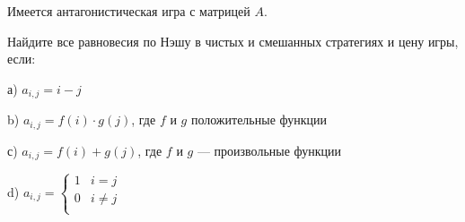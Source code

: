 \begin{problem}
 Имеется антагонистическая игра с матрицей $A$.

Найдите все равновесия по Нэшу в чистых и смешанных стратегиях и
цену игры, если:

а) $a_{i,j}=i-j$

b) $a_{i,j}=f(i)\cdot g(j)$, где $f$ и $g$ положительные функции

с) $a_{i,j}=f(i)+g(j)$, где $f$ и $g$ — произвольные функции

d) $a_{i,j}=\left\{
\begin{array}{cc}
  1 & i=j \\
  0 & i\neq j \\
\end{array}\right.$



\begin{sol}

\end{sol}
\end{problem}



